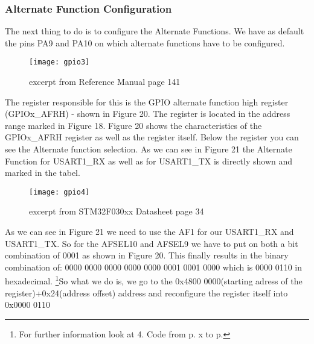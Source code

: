 \documentclass[11pt]{scrartcl}
\begin{document}
	\subsubsection{Alternate Function Configuration}
The next thing to do is to configure the Alternate Functions. We have as default the pins PA9 and PA10 on which alternate functions have to be configured. 
\begin{figure}[h]
		\centering
		\texttt{[image: gpio3]}
		\caption{excerpt from Reference Manual page 141}
\end{figure}
The register responsible for this is the GPIO alternate function high register (GPIOx\_AFRH) - shown in Figure 20. The register is located in the address range marked in Figure 18. Figure 20 shows the characteristics of the GPIOx\_AFRH register as well as the register itself. Below the register you can see the Alternate function selection. As we can see in Figure 21 the Alternate Function for USART1\_RX as well as for USART1\_TX is directly shown and marked in the tabel.
\begin{figure}[h]
		\centering
		\texttt{[image: gpio4]}
		\caption{excerpt from STM32F030xx Datasheet page 34}
\end{figure}
As we can see in Figure 21 we need to use the AF1 for our USART1\_RX and USART1\_TX. So for the AFSEL10 and AFSEL9 we have to put on both a bit combination of 0001 as shown in Figure 20. \newline\newline
This finally results in the binary combination of: 0000 0000 0000 0000 0000 0001 0001 0000 which is 0000 0110 in hexadecimal.
\newline\newline
\footnote{\label{foot:19}For further information look at 4. Code from p. x to p.}So what we do is, we go to the 0x4800 0000(starting adress of the register)+0x24(address offset) address and reconfigure the register itself into 0x0000 0110



\newpage
\end{document}
